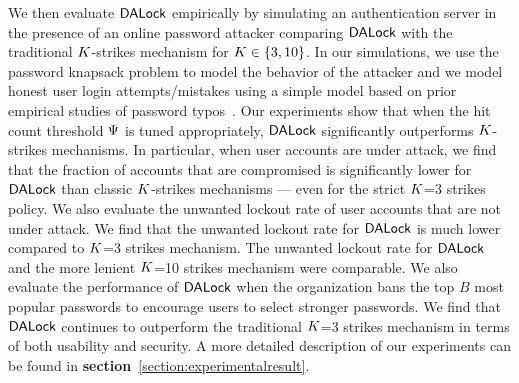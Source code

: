 We then evaluate $\mathsf{DALock}$ empirically by simulating an authentication server in the presence of an online password attacker comparing $\mathsf{DALock}$ with the traditional $K$-strikes mechanism for $K \in \{3,10\}$. In our simulations, we use the password knapsack problem to model the behavior of the attacker and we model honest user login attempts/mistakes using a simple model based on prior empirical studies of password typos~\cite{CCS:CWPCR17,SP:CAAJR16}. Our experiments show that when the hit count threshold $\Psi$ is tuned appropriately, $\mathsf{DALock}$ significantly outperforms $K$-strikes mechanisms. In particular, when user accounts are under attack, we find that the fraction of accounts that are compromised is significantly lower for $\mathsf{DALock}$ than classic $K$-strikes mechanisms --- even for the strict $K$=3 strikes policy. We also evaluate the unwanted lockout rate of user accounts that are not under attack. We find that the unwanted lockout rate for $\mathsf{DALock}$ is much lower compared to $K$=3 strikes mechanism. The unwanted lockout rate for $\mathsf{DALock}$ and the more lenient $K$=10 strikes mechanism were comparable. We also evaluate the performance of $\mathsf{DALock}$ when the organization bans the top $B$ most popular passwords to encourage users to select stronger passwords. We find that $\mathsf{DALock}$ continues to outperform the traditional $K$=3 strikes mechanism in terms of both usability and security. A more detailed description of our experiments can be found in \textbf{section}~\ref{section:experimentalresult}.















